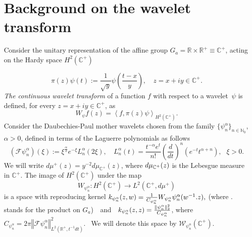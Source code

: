 \documentclass[11pt,reqno]{amsart}
\numberwithin{equation}{section}
\theoremstyle{plain}
\theoremstyle{definition}
\theoremstyle{remark}
\begin{document}
\section{\textbf{Background on the wavelet transform}}

Consider the unitary representation of the affine group $G_{a}=\mathbb{R}%
\times \mathbb{R}^{+}\equiv \mathbb{C}^{+}$, acting on the Hardy space $%
H^{2}\left( \mathbb{C}^{+}\right) $

\begin{equation*}
\pi (z)\psi (t):=\frac{1}{\sqrt{y}}\psi \left( \frac{t-x}{y}\right) ,\quad
z=x+iy\in \mathbb{C}^{+}\text{.}
\end{equation*}%
\emph{The continuous wavelet transform} of a function $f$ with respect to a
wavelet\ $\psi $ is defined, for every $z=x+iy\in \mathbb{C}^{+}$, as 
\begin{equation}
W_{\psi }f(z)=\left\langle f,\pi ({z})\psi \right\rangle _{H^{2}\left( 
\mathbb{C}^{+}\right) }\text{.}  \label{wavelet}
\end{equation}%
Consider the Daubechies-Paul \cite{DauTS} mother wavelets chosen from the
family $\{\psi _{n}^{\alpha }\}_{n\in \mathbb{N}_{0}}$, $\alpha >0$, defined
in terms of the Laguerre polynomials as follows 
\begin{equation}
(\mathcal{F}\psi _{n}^{\alpha })(\xi ):=\xi ^{\frac{\alpha }{2}}e^{-\xi
}L_{n}^{\alpha }(2\xi ),\quad L_{n}^{\alpha }(t)=\frac{t^{-\alpha }e^{t}}{n!}%
\left( \frac{d}{dt}\right) ^{n}(e^{-t}t^{\alpha +n}),\text{ }\xi >0\text{.}
\label{mother}
\end{equation}%
We will write $d\mu ^{+}(z)=y^{-2}d\mu _{\mathbb{C}^{+}}(z)$, where $d\mu _{%
\mathbb{C}^{+}}(z)\ $is the Lebesgue measure in $\mathbb{C}^{+}$. The image
of $H^{2}\left( \mathbb{C}^{+}\right) $ under the map%
\begin{equation*}
W_{\psi _{n}^{\alpha }}:H^{2}\left( \mathbb{C}^{+}\right) \rightarrow L^{2}(%
\mathbb{C}^{+},d\mu ^{+})
\end{equation*}%
is a space with reproducing kernel $k_{\psi _{n}^{\alpha }}(z,w)=\frac{1}{%
C_{\psi _{n}^{\alpha }}}W_{\psi _{n}^{\alpha }}\psi _{n}^{\alpha }({w}%
^{-1}.z),$ (where $.$ stands for the product on $G_{a}$)$\quad $and$\quad
k_{\psi _{n}^{\alpha }}(z,z)=\frac{\Vert \psi _{n}^{\alpha }\Vert _{2}^{2}}{%
C_{\psi _{n}^{\alpha }}}$, where $C_{\psi _{n}^{\alpha }}=2\pi \left\Vert 
\mathcal{F}\psi _{n}^{\alpha }\right\Vert _{L^{2}(%
\mathbb{R}
^{+},t^{-1}dt)}^{2}$. \ We will denote this space by $\mathcal{W}_{\psi
_{n}^{\alpha }}(\mathbb{C}^{+})$.
\end{document}
